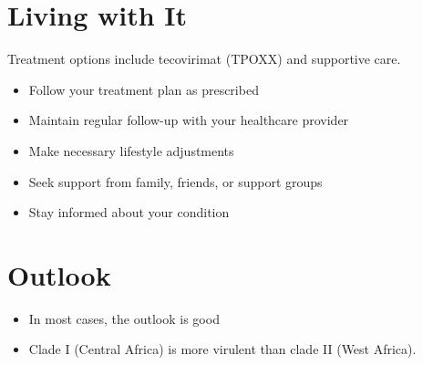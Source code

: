 \section{Living with It}
Treatment options include tecovirimat (TPOXX) and supportive care.

\begin{itemize}[noitemsep]
  \item Follow your treatment plan as prescribed
  \item Maintain regular follow-up with your healthcare provider
  \item Make necessary lifestyle adjustments
  \item Seek support from family, friends, or support groups
  \item Stay informed about your condition
\end{itemize}
\section{Outlook}
\begin{itemize}[noitemsep]
  \item In most cases, the outlook is good
  \item Clade I (Central Africa) is more virulent than clade II (West Africa).
\end{itemize}
